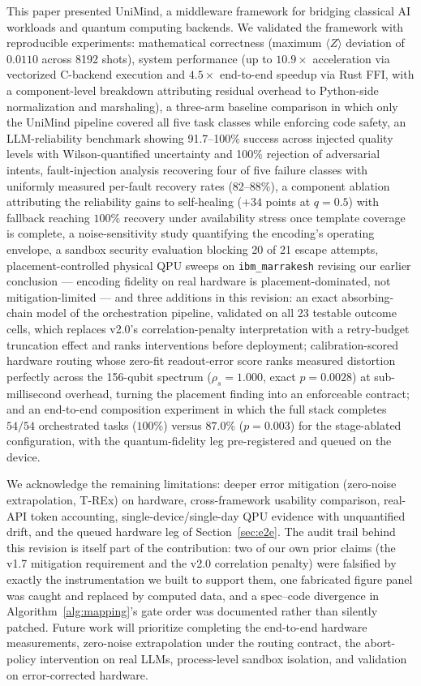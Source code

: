 ﻿\documentclass[12pt,a4paper]{article}
\begin{document}
This paper presented UniMind, a middleware framework for bridging classical AI workloads and quantum computing backends. We validated the framework with reproducible experiments: mathematical correctness (maximum $\langle Z \rangle$ deviation of $0.0110$ across 8192 shots), system performance (up to $10.9\times$ acceleration via vectorized C-backend execution and $4.5\times$ end-to-end speedup via Rust FFI, with a component-level breakdown attributing residual overhead to Python-side normalization and marshaling), a three-arm baseline comparison in which only the UniMind pipeline covered all five task classes while enforcing code safety, an LLM-reliability benchmark showing 91.7--100\% success across injected quality levels with Wilson-quantified uncertainty and 100\% rejection of adversarial intents, fault-injection analysis recovering four of five failure classes with uniformly measured per-fault recovery rates (82--88\%), a component ablation attributing the reliability gains to self-healing ($+34$ points at $q{=}0.5$) with fallback reaching $100\%$ recovery under availability stress once template coverage is complete, a noise-sensitivity study quantifying the encoding's operating envelope, a sandbox security evaluation blocking 20 of 21 escape attempts, placement-controlled physical QPU sweeps on \texttt{ibm\_marrakesh} revising our earlier conclusion --- encoding fidelity on real hardware is placement-dominated, not mitigation-limited --- and three additions in this revision: an exact absorbing-chain model of the orchestration pipeline, validated on all 23 testable outcome cells, which replaces v2.0's correlation-penalty interpretation with a retry-budget truncation effect and ranks interventions before deployment; calibration-scored hardware routing whose zero-fit readout-error score ranks measured distortion perfectly across the 156-qubit spectrum ($\rho_s = 1.000$, exact $p = 0.0028$) at sub-millisecond overhead, turning the placement finding into an enforceable contract; and an end-to-end composition experiment in which the full stack completes $54/54$ orchestrated tasks ($100\%$) versus $87.0\%$ ($p = 0.003$) for the stage-ablated configuration, with the quantum-fidelity leg pre-registered and queued on the device.

We acknowledge the remaining limitations: deeper error mitigation (zero-noise extrapolation, T-REx) on hardware, cross-framework usability comparison, real-API token accounting, single-device/single-day QPU evidence with unquantified drift, and the queued hardware leg of Section~\ref{sec:e2e}. The audit trail behind this revision is itself part of the contribution: two of our own prior claims (the v1.7 mitigation requirement and the v2.0 correlation penalty) were falsified by exactly the instrumentation we built to support them, one fabricated figure panel was caught and replaced by computed data, and a spec--code divergence in Algorithm~\ref{alg:mapping}'s gate order was documented rather than silently patched. Future work will prioritize completing the end-to-end hardware measurements, zero-noise extrapolation under the routing contract, the abort-policy intervention on real LLMs, process-level sandbox isolation, and validation on error-corrected hardware.
\end{document}

